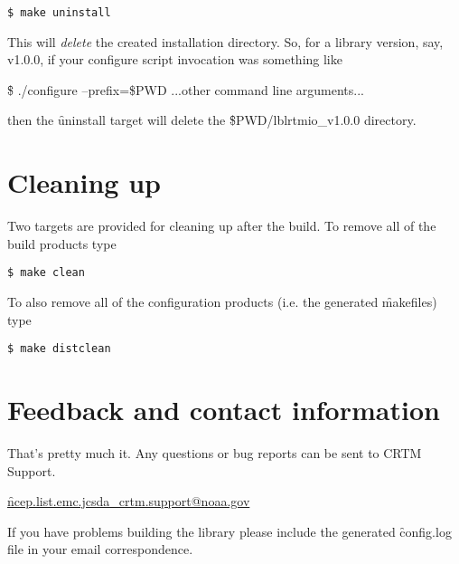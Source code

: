 \begin{verbatim}$ make uninstall\end{verbatim}

This will \emph{delete} the created installation directory. So, for a library version, say, v1.0.0, if your configure script invocation was something like

\f{\$ ./configure --prefix=\${PWD} }...other command line arguments...

then the \f{uninstall} target will delete the \f{\${PWD}/lblrtmio\_v1.0.0} directory.



\section{Cleaning up}

Two targets are provided for cleaning up after the build. To remove all of the build products type

\begin{verbatim}$ make clean\end{verbatim}

To also remove all of the configuration products (i.e. the generated \f{makefile}s) type

\begin{verbatim}$ make distclean\end{verbatim}


\section{Feedback and contact information}

That's pretty much it. Any questions or bug reports can be sent to CRTM Support.

\href{mailto:ncep.list.emc.jcsda_crtm.support@noaa.gov}{\f{ncep.list.emc.jcsda\_crtm.support@noaa.gov}}

If you have problems building the library please include the generated \f{config.log} file in your email correspondence.
